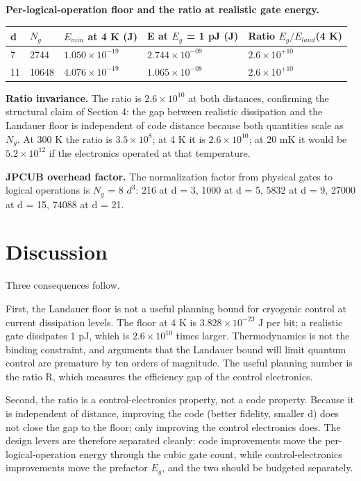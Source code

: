 \documentclass[11pt]{article}
\begin{document}
\textbf{Per-logical-operation floor and the ratio at realistic gate energy.}

\begin{table}[h]
\centering
\begin{tabular}{lllll}
\toprule
d & $N_{g}$ & $E_{min}$ at 4 K (J) & E at $E_{g}$ = 1 pJ (J) & Ratio $E_{g} / E_{land}$(4 K) \\
\midrule
7 & 2744 & $1.050\times 10^{-19}$ & $2.744\times 10^{-09}$ & $2.6\times 10^{+10}$ \\
11 & 10648 & $4.076\times 10^{-19}$ & $1.065\times 10^{-08}$ & $2.6\times 10^{+10}$ \\
\bottomrule
\end{tabular}
\end{table}

\textbf{Ratio invariance.} The ratio is $2.6\times 10^{10}$ at both distances, confirming the structural claim of Section 4: the gap between realistic dissipation and the Landauer floor is independent of code distance because both quantities scale as $N_{g}$. At 300 K the ratio is $3.5\times 10^{8}$; at 4 K it is $2.6\times 10^{10}$; at 20 mK it would be $5.2\times 10^{12}$ if the electronics operated at that temperature.

\textbf{JPCUB overhead factor.} The normalization factor from physical gates to logical operations is $N_{g}$ = 8 $d^{3}$: 216 at d = 3, 1000 at d = 5, 5832 at d = 9, 27000 at d = 15, 74088 at d = 21.

\section{Discussion}
Three consequences follow.

First, the Landauer floor is not a useful planning bound for cryogenic control at current dissipation levels. The floor at 4 K is $3.828\times 10^{-23}$ J per bit; a realistic gate dissipates 1 pJ, which is $2.6\times 10^{10}$ times larger. Thermodynamics is not the binding constraint, and arguments that the Landauer bound will limit quantum control are premature by ten orders of magnitude. The useful planning number is the ratio R, which measures the efficiency gap of the control electronics.

Second, the ratio is a control-electronics property, not a code property. Because it is independent of distance, improving the code (better fidelity, smaller d) does not close the gap to the floor; only improving the control electronics does. The design levers are therefore separated cleanly: code improvements move the per-logical-operation energy through the cubic gate count, while control-electronics improvements move the prefactor $E_{g}$, and the two should be budgeted separately.
\end{document}

